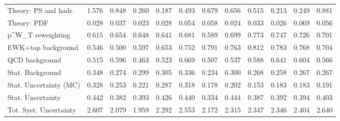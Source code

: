 \begin{tabular}{l|p{0.6cm}p{0.6cm}p{0.6cm}p{0.6cm}p{0.6cm}p{0.6cm}p{0.6cm}p{0.6cm}p{0.6cm}p{0.6cm}p{0.6cm}}
Theory: PS and hadr.                     & 1.576 & 0.848 & 0.260 & 0.187 & 0.493 & 0.679 & 0.656 & 0.515 & 0.213 & 0.249 & 0.881 \\
Theory: PDF                              & 0.028 & 0.037 & 0.023 & 0.028 & 0.054 & 0.058 & 0.024 & 0.033 & 0.026 & 0.069 & 0.056 \\
p^{W}_{T} reweighting                    & 0.615 & 0.654 & 0.648 & 0.641 & 0.681 & 0.589 & 0.699 & 0.773 & 0.747 & 0.726 & 0.701 \\
EWK+top background                       & 0.546 & 0.500 & 0.597 & 0.653 & 0.752 & 0.791 & 0.763 & 0.812 & 0.783 & 0.768 & 0.704 \\
QCD background                           & 0.515 & 0.596 & 0.463 & 0.523 & 0.669 & 0.507 & 0.537 & 0.588 & 0.641 & 0.604 & 0.566 \\
Stat. Background                         & 0.348 & 0.274 & 0.299 & 0.305 & 0.336 & 0.234 & 0.300 & 0.268 & 0.258 & 0.267 & 0.267 \\
Stat. Uncertainty (MC)                   & 0.328 & 0.253 & 0.221 & 0.287 & 0.318 & 0.178 & 0.202 & 0.153 & 0.183 & 0.183 & 0.191 \\
\hline
Stat. Uncertainty                        & 0.442 & 0.382 & 0.393 & 0.426 & 0.440 & 0.334 & 0.444 & 0.387 & 0.392 & 0.394 & 0.403 \\
\hline
Tot. Syst. Uncertainty                   & 2.607 & 2.079 & 1.959 & 2.292 & 2.553 & 2.172 & 2.315 & 2.347 & 2.346 & 2.404 & 2.640 \\
\hline
\end{tabular}

